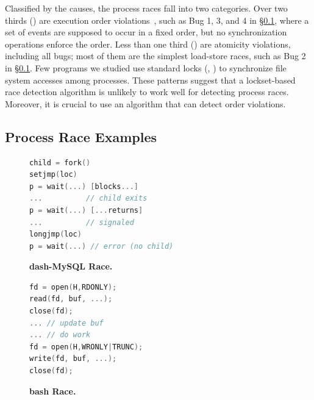   Classified by the causes, the
\nprace process races fall into two categories.  Over two
thirds (\norder) are execution order
violations~\cite{lu:concurrency-bugs}, 
such as Bug 1, 3, and 4 in \S\ref{racepro:sec:example},
where a set of events are
supposed to occur in a fixed order, but no synchronization operations
enforce the order.
Less than one third (\natomic) are atomicity violations, including all
\toctou bugs; most of them are the simplest load-store
races, such as Bug 2 in \S\ref{racepro:sec:example}. 
Few programs we studied use standard locks (\eg, ) to
synchronize file system accesses among processes.
These patterns suggest that a lockset-based race detection algorithm is
unlikely to work well for detecting process races.  Moreover, it is crucial
to use an algorithm that can detect order violations.

\subsection{Process Race Examples} \label{racepro:sec:example}

\begin{figure}
\centering
\begin{minipage}{.4\textwidth}
  \begin{rbox}
\begin{lstlisting}[language=C,framexleftmargin=5pt]
child = fork()
setjmp(loc)
p = wait(...) [blocks...]
...          // child exits
p = wait(...) [...returns]
...          // signaled
longjmp(loc)
p = wait(...) // error (no child)
\end{lstlisting}
\end{rbox}
\vspace{-1.5em}
  \caption{{\bf dash-MySQL Race.}}
  \label{racepro:fig:dash-mysql}
\end{minipage}
\hspace{3em}
\begin{minipage}{.4\textwidth}
  \begin{rbox}
\begin{lstlisting}[language=C,framexleftmargin=5pt]
fd = open(H,RDONLY);
read(fd, buf, ...);
close(fd);
... // update buf
... // do work
fd = open(H,WRONLY|TRUNC);
write(fd, buf, ...);
close(fd);
\end{lstlisting}
\end{rbox}
\vspace{-1.5em}
      \caption{{\bf bash Race.}}
      \label{racepro:fig:bash}
\end{minipage}
\end{figure}

